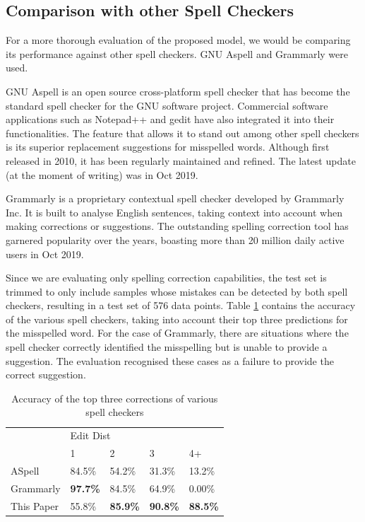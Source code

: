 \documentclass[11pt,a4paper]{article}
\begin{document}
\subsection{Comparison with other Spell Checkers} \label{otherspellcheckers}
For a more thorough evaluation of the proposed model, we would be comparing its performance against other spell checkers. GNU Aspell \cite{Aspell} and Grammarly \cite{Grammarly} were used.

GNU Aspell is an open source cross-platform spell checker that has become the standard spell checker for the GNU software project. Commercial software applications such as Notepad++ and gedit have also integrated it into their functionalities. The feature that allows it to stand out among other spell checkers is its superior replacement suggestions for misspelled words. Although first released in 2010, it has been regularly maintained and refined. The latest update (at the moment of writing) was in Oct 2019. 

Grammarly is a proprietary contextual spell checker developed by Grammarly Inc. It is built to analyse English sentences, taking context into account when making corrections or suggestions. The outstanding spelling correction tool has garnered popularity over the years, boasting more than 20 million daily active users in Oct 2019. 

Since we are evaluating only spelling correction capabilities, the test set is trimmed to only include samples whose mistakes can be detected by both spell checkers, resulting in a test set of 576 data points. Table \ref{Tab:SpellCheckResults} contains the accuracy of the various spell checkers, taking into account their top three predictions for the misspelled word. For the case of Grammarly, there are situations where the spell checker correctly identified the misspelling but is unable to provide a suggestion. The evaluation recognised these cases as a failure to provide the correct suggestion. 

\begin{table}[]		
\caption{Accuracy of the top three corrections of various spell checkers}
\begin{tabular}{l|llll}
           & \multicolumn{4}{l}{Edit Dist} \\ \cline{2-5} 
           & 1      & 2      & 3      & 4+     \\ \hline
ASpell     & 84.5\% & 54.2\% & 31.3\% & 13.2\%    \\
Grammarly  & \textbf{97.7\%} & 84.5\% & 64.9\% & 0.00\%  \\
This Paper & 55.8\% & \textbf{85.9\%} & \textbf{90.8\%} & \textbf{88.5\%}     
\end{tabular}
\label{Tab:SpellCheckResults}   
\end{table}
\end{document}
